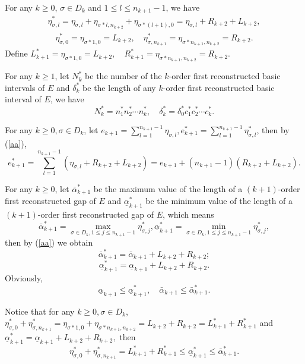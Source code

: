 \documentclass[reqno]{amsart}
\theoremstyle{plain}
\theoremstyle{definition}
\theoremstyle{remark}
\numberwithin{equation}{section} \DeclareMathOperator\intr{int}
\begin{document}
For any $k\ge 0$, $\sigma\in D_{k}$ and $1\le l \le n_{k+1}-1$, we have
\begin{align}\label{aa}
\eta^*_{\sigma,l}=\eta_{\sigma,l}+\eta_{\sigma*l,n_{k+2}}+\eta_{\sigma*(l+1),0}=\eta_{\sigma,l}+R_{k+2}+L_{k+2}
  ,\end{align}\begin{align}\label{ab}
 \eta^*_{\sigma,0}=\eta_{\sigma*1,0}=L_{k+2}, \quad
 \eta^*_{\sigma,n_{k+1}}=\eta_{\sigma*{n_{k+1}},n_{k+2}}=R_{k+2}.
\end{align}
Define $ L^*_{k+1}=\eta_{\sigma*1,0}=L_{k+2}, \quad
   R^*_{k+1}=\eta_{\sigma*{n_{k+1}},n_{k+2}}=R_{k+2}.$

For any $k\ge 1$, let $N^*_{k}$ be the number of the $k$-order first reconstructed basic intervals of $E$ and $\delta^*_{k}$ be the length of any $k$-order first reconstructed basic interval of $E$, we have
 $$N^*_{k}=n^*_1n^*_2\cdots n^*_{k},\quad \delta^*_{k}=\delta^*_0c^*_1c^*_2\cdots c^*_{k}.$$

For any $k\ge0, \sigma \in D_{k}$, let $e_{k+1}=\sum_{l=1}^{n_{k+1}-1}\eta_{\sigma,l}, e^{*}_{k+1}=\sum_{l=1}^{n_{k+1}-1}\eta^{*}_{\sigma,l}$,
then by (\ref{aa}),
\begin{equation}
e^*_{k+1}=\sum_{l=1}^{n_{k+1}-1}(\eta_{\sigma,l}+R_{k+2}+L_{k+2})=e_{k+1}+(n_{k+1}-1)(R_{k+2}+L_{k+2}). \nonumber
\end{equation}

For any $k\ge 0$, let $\bar\alpha^*_{k+1}$ be the maximum value of the length of a $(k+1)$-order  first reconstructed  gap of $E$ and $\underline\alpha^*_{k+1}$ be the minimum value of  the length of a $(k+1)$-order  first reconstructed  gap  of $E$, which means
$$\bar\alpha^*_{k+1}=\max\limits_{\sigma\in D_{k}, 1\leq j\leq n_{k+1}-1}\eta^*_{\sigma,j},
\underline\alpha^*_{k+1}=\min\limits_{\sigma\in D_{k}, 1\leq j\leq n_{k+1}-1}\eta^*_{\sigma,j},$$
then by (\ref{aa}) we  obtain
\begin{equation}\label{444}
\bar\alpha^*_{k+1}=\bar\alpha_{k+1}+L_{k+2}+R_{k+2};
\end{equation}
\begin{equation}\label{445}
\underline\alpha^*_{k+1}=\underline\alpha_{k+1}+L_{k+2}+R_{k+2}.
\end{equation}
Obviously,
\begin{equation}\label{42}
\underline\alpha_{k+1}\le \underline\alpha^*_{k+1},\quad  \bar\alpha_{k+1}\le\bar\alpha^*_{k+1}.
\end{equation}

Notice that for any $k\ge 0, \sigma \in D_{k}$, $\eta^*_{\sigma,0}+\eta^*_{\sigma,n_{k+1}}=\eta_{\sigma*1,0}+\eta_{\sigma*{n_{k+1}},n_{k+2}}=L_{k+2}+R_{k+2}=L^{*}_{k+1}+R^{*}_{k+1} $ and $\underline\alpha^*_{k+1}=\underline\alpha_{k+1}+L_{k+2}+R_{k+2}, $ then
\begin{equation}\label{447}
\eta^*_{\sigma,0}+\eta^*_{\sigma,n_{k+1}}=L^{*}_{k+1}+R^{*}_{k+1}\le \underline\alpha^*_{k+1} \le \bar\alpha^*_{k+1}.
\end{equation}
\end{document}
